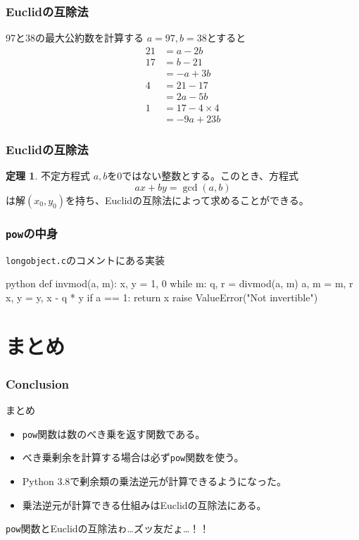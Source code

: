 \documentclass[aspectratio=169,dvipdfmx,14pt,notheorems]{beamer}
\theoremstyle{definition}
\newtheorem{theorem}{定理}
\begin{document}
\begin{frame}[fragile]\frametitle{Euclidの互除法}
\begin{exampleblock}{97と38の最大公約数を計算する}
$a=97, b=38$とすると
\begin{align*}
21 &= a -2b \\
17 &= b -21 \\
     &= -a + 3b \\
4   &= 21 - 17 \\
     &= 2a - 5b \\
1 &= 17 - 4 \times 4 \\
   &= -9a + 23b
\end{align*}
\end{exampleblock}
\end{frame}

\begin{frame}[fragile]\frametitle{Euclidの互除法}
\begin{theorem}{不定方程式}
$a, b$を0ではない整数とする。このとき、方程式
\begin{equation*}
ax + by = \gcd(a, b)
\end{equation*}
は解$(x_{0}, y_{0})$を持ち、Euclidの互除法によって求めることができる。
\end{theorem}
\end{frame}

\begin{frame}[fragile]\frametitle{\texttt{pow}の中身}
\begin{block}{\texttt{longobject.c}のコメントにある実装}
\begin{pygments}{python}
def invmod(a, m):
    x, y = 1, 0
    while m:
        q, r = divmod(a, m)
        a, m = m, r
        x, y = y, x - q * y
    if a == 1:
        return x
    raise ValueError("Not invertible")
\end{pygments}
\end{block}
\end{frame}


\section{まとめ}

\begin{frame}[fragile]\frametitle{Conclusion}
\begin{block}{まとめ}
\begin{itemize}
\item \texttt{pow}関数は数のべき乗を返す関数である。
\item べき乗剰余を計算する場合は必ず\texttt{pow}関数を使う。
\item Python 3.8で剰余類の乗法逆元が計算できるようになった。
\item 乗法逆元が計算できる仕組みはEuclidの互除法にある。
\end{itemize}
\end{block}
\texttt{pow}関数とEuclidの互除法ゎ…ズッ友だょ…！！
\end{frame}
\end{document}
